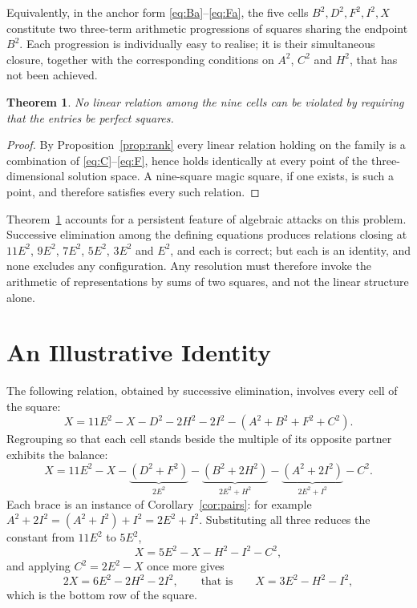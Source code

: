 \documentclass[12pt]{article}
\newtheorem{theorem}{Theorem}
\theoremstyle{remark}
\begin{document}
Equivalently, in the anchor form \eqref{eq:Ba}--\eqref{eq:Fa}, the
five cells $B^2, D^2, F^2, I^2, X$ constitute two three-term arithmetic
progressions of squares sharing the endpoint $B^2$. Each progression is
individually easy to realise; it is their simultaneous closure,
together with the corresponding conditions on $A^2$, $C^2$ and $H^2$,
that has not been achieved.

\begin{theorem}\label{thm:nolinear}
No linear relation among the nine cells can be violated by requiring
that the entries be perfect squares.
\end{theorem}

\begin{proof}
By Proposition~\ref{prop:rank} every linear relation holding on the
family is a combination of \eqref{eq:C}--\eqref{eq:F}, hence holds
identically at every point of the three-dimensional solution space. A
nine-square magic square, if one exists, is such a point, and therefore
satisfies every such relation.
\end{proof}

Theorem~\ref{thm:nolinear} accounts for a persistent feature of
algebraic attacks on this problem. Successive elimination among the
defining equations produces relations closing at $11E^2$, $9E^2$,
$7E^2$, $5E^2$, $3E^2$ and $E^2$, and each is correct; but each is an
identity, and none excludes any configuration. Any resolution must
therefore invoke the arithmetic of representations by sums of two
squares, and not the linear structure alone.

\section{An Illustrative Identity}\label{sec:11E}

The following relation, obtained by successive elimination, involves
every cell of the square:
\[
X = 11E^2 - X - D^2 - 2H^2 - 2I^2 - (A^2 + B^2 + F^2 + C^2).
\tag{II1}
\]
Regrouping so that each cell stands beside the multiple of its
opposite partner exhibits the balance:
\[
X = 11E^2 - X
- \underbrace{(D^2 + F^2)}_{2E^2}
- \underbrace{(B^2 + 2H^2)}_{2E^2 + H^2}
- \underbrace{(A^2 + 2I^2)}_{2E^2 + I^2}
- C^2 .
\]
Each brace is an instance of Corollary~\ref{cor:pairs}: for example
$A^2 + 2I^2 = (A^2 + I^2) + I^2 = 2E^2 + I^2$. Substituting all three
reduces the constant from $11E^2$ to $5E^2$,
\[
X = 5E^2 - X - H^2 - I^2 - C^2 ,
\]
and applying $C^2 = 2E^2 - X$ once more gives
\[
2X = 6E^2 - 2H^2 - 2I^2,
\qquad\text{that is}\qquad
X = 3E^2 - H^2 - I^2 ,
\]
which is the bottom row of the square.
\end{document}
